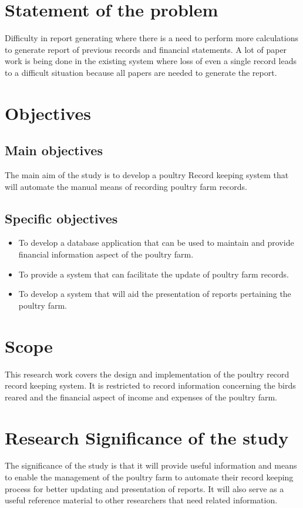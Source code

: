 \documentclass[12pt,]{article}
\begin{document}
\section{Statement of the problem}
Difficulty in report generating where there is a need to perform more calculations to generate report of previous records and financial statements. A lot of paper work is being done in the existing system where loss of even a single record leads to a difficult situation because all papers are needed to generate
the report.
\section{ Objectives}
\subsection{ Main objectives}
The main aim of the study is to develop a poultry Record keeping system
that will automate the manual means of recording poultry farm records.
\subsection{Specific objectives}
\begin{itemize}
\item To develop a database application that can be used to maintain and
provide financial information aspect of the poultry farm.
\item To provide a system that can facilitate the update of poultry farm
records.
\item To develop a system that will aid the presentation of reports pertaining
the poultry farm.
\end{itemize}

\section{Scope}
This research work covers the design and implementation of the poultry
record record keeping system. It is restricted to record information concerning the birds reared and the financial aspect of income and expenses of
the poultry farm.
\section{Research Significance of the study}
The significance of the study is that it will provide useful information and
means to enable the management of the poultry farm to automate their
record keeping process for better updating and presentation of reports. It
will also serve as a useful reference material to other researchers that need
related information.
\end{document}
